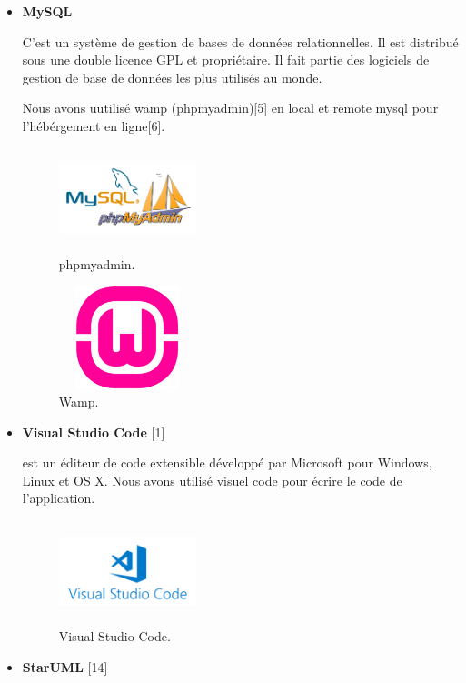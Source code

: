 \begin{itemize}



\item {  \textbf{MySQL} }


C'est un syst\`{e}me de gestion de bases de données relationnelles. Il est distribu\'{e}
sous une double licence GPL et propri\'{e}taire. Il fait partie des logiciels de gestion
de base de donn\'{e}es les plus utilis\'{e}s au monde.

Nous avons uutilis\'{e} wamp (phpmyadmin)[5]  en local et remote mysql pour l'h\'{e}b\'{e}rgement en ligne[6]. \newline



\FloatBarrier
\begin{figure}[H]
\center
\includegraphics[width=4cm,height=3cm]{./figures/teklogos/phpmyadmin.png}
\caption{phpmyadmin.}
\end{figure}
\FloatBarrier

\FloatBarrier
\begin{figure}[H]
\center
\includegraphics[width=4cm,height=3cm]{./figures/teklogos/wamp.png}
\caption{Wamp.}
\end{figure}
\FloatBarrier

\item {  \textbf{Visual Studio Code} } [1]

est un \'{e}diteur de code extensible d\'{e}velopp\'{e} par Microsoft pour Windows,
Linux et OS X.
Nous avons utilis\'{e} visuel code pour \'{e}crire le code de l'application. \newline


\FloatBarrier
\begin{figure}[H]
\center
\includegraphics[width=4cm,height=3cm]{./figures/teklogos/vscode.png}
\caption{Visual Studio Code.}
\end{figure}
\FloatBarrier
\item {  \textbf{StarUML} } [14]


\end{itemize}
